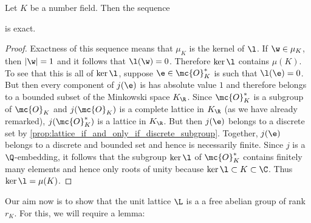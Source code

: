       \begin{proposition}\label{prop:exact_sequence_for_Dirichlets_unit_theorem}
        Let $K$ be a number field. Then the sequence

        \begin{center}
        \end{center}

        is exact.
      \end{proposition}
      \begin{proof}
        Exactness of this sequence means that $\mu_{K}$ is the kernel of $\l$. If $\w \in \mu_{K}$, then $|\w| = 1$ and it follows that $\l(\w) = 0$. Therefore $\ker\l$ contains $\mu(K)$. To see that this is all of $\ker\l$, suppose $\e \in \mc{O}_{K}^{\ast}$ is such that $\l(\e) = 0$. But then every component of $j(\e)$ is has absolute value $1$ and therefore belongs to a bounded subset of the Minkowski space $K_{\R}$. Since $\mc{O}_{K}^{\ast}$ is a subgroup of $\mc{O}_{K}$ and $j(\mc{O}_{K})$ is a complete lattice in $K_{\R}$ (as we have already remarked), $j(\mc{O}_{K}^{\ast})$ is a lattice in $K_{\R}$. But then $j(\e)$ belongs to a discrete set by \cref{prop:lattice_if_and_only_if_discrete_subgroup}. Together, $j(\e)$ belongs to a discrete and bounded set and hence is necessarily finite. Since $j$ is a $\Q$-embedding, it follows that the subgroup $\ker\l$ of $\mc{O}_{K}^{\ast}$ contains finitely many elements and hence only roots of unity because $\ker\l \subset K \subset \C$. Thus $\ker\l = \mu(K)$.
      \end{proof}

      Our aim now is to show that the unit lattice $\L$ is a a free abelian group of rank $r_{K}$. For this, we will require a lemma:

